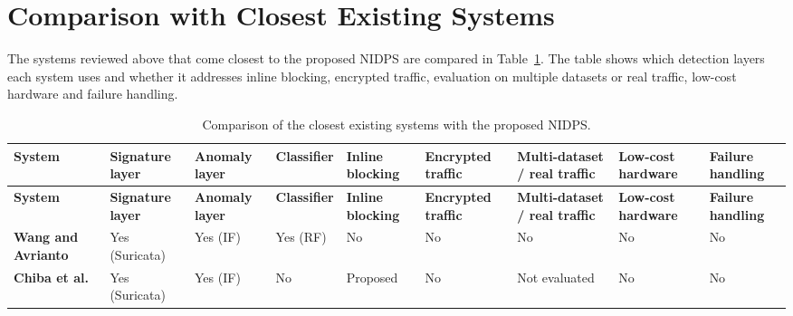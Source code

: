 \section{Comparison with Closest Existing Systems}\label{sec:3.5}

\noindent The systems reviewed above that come closest to the proposed NIDPS are compared in Table~\ref{tab:3.3}. The table shows which detection layers each system uses and whether it addresses inline blocking, encrypted traffic, evaluation on multiple datasets or real traffic, low-cost hardware and failure handling.

{\scriptsize\setlength{\tabcolsep}{3.5pt}
\begin{longtable}{|>{\raggedright\arraybackslash}p{}|>{\raggedright\arraybackslash}p{}|>{\raggedright\arraybackslash}p{}|>{\raggedright\arraybackslash}p{}|>{\raggedright\arraybackslash}p{}|>{\raggedright\arraybackslash}p{}|>{\raggedright\arraybackslash}p{}|>{\raggedright\arraybackslash}p{}|>{\raggedright\arraybackslash}p{}|}
\caption{Comparison of the closest existing systems with the proposed NIDPS.}\label{tab:3.3}\\
\hline
\textbf{System} & \textbf{Signature layer} & \textbf{Anomaly layer} & \textbf{Classifier} & \textbf{Inline blocking} & \textbf{Encrypted traffic} & \textbf{Multi-dataset / real traffic} & \textbf{Low-cost hardware} & \textbf{Failure handling} \\ \hline
\endfirsthead
\hline
\textbf{System} & \textbf{Signature layer} & \textbf{Anomaly layer} & \textbf{Classifier} & \textbf{Inline blocking} & \textbf{Encrypted traffic} & \textbf{Multi-dataset / real traffic} & \textbf{Low-cost hardware} & \textbf{Failure handling} \\ \hline
\endhead
\textbf{Wang and Avrianto~\cite{lr:wang2025}} & Yes (Suricata) & Yes (IF) & Yes (RF) & No & No & No & No & No \\ \hline
\textbf{Chiba et al.~\cite{lr:chiba2019}} & Yes (Suricata) & Yes (IF) & No & Proposed & No & Not evaluated & No & No \\ \hline

\end{longtable}}
